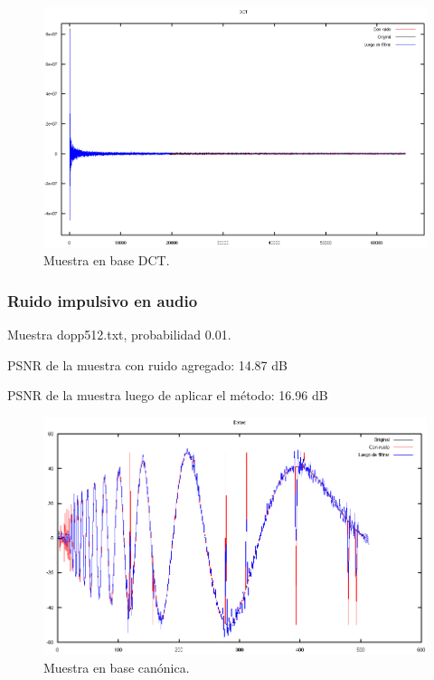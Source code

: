 \documentclass[a4paper,10pt,twoside]{article}
\begin{document}
\begin{figure}[H]
  \centering
  \includegraphics[width=15cm]{graficos/lena_aditivo_umbralizar_dct.png} 
  \caption{Muestra en base DCT.}
\end{figure}


\subsubsection{Ruido impulsivo en audio}

Muestra dopp512.txt, probabilidad 0.01.

PSNR de la muestra con ruido agregado: 14.87 dB

PSNR de la muestra luego de aplicar el método: 16.96 dB

\begin{figure}[H]
  \centering
  \includegraphics[width=15cm]{graficos/dopp_impulsivo_umbralizar_muestra.png}
  \caption{Muestra en base canónica.}
\end{figure}
\end{document}
